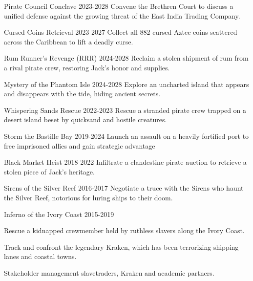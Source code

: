 \begin{cventries}
\cventry
{Pirate Council Conclave} %
{}{}
{2023-2028} %
{ %
Convene the Brethren Court to discuss a unified defense against the growing threat of the East India Trading Company.
}

\cventry
{Cursed Coins Retrieval} %
{}{}
{2023-2027} %
{ %
Collect all 882 cursed Aztec coins scattered across the Caribbean to lift a deadly curse.
}

\cventry
{Rum Runner’s Revenge (RRR)} %
{}{}
{2024-2028} %
{ %
Reclaim a stolen shipment of rum from a rival pirate crew, restoring Jack's honor and supplies.
}

\cventry
{Mystery of the Phantom Isle} %
{}{}
{2024-2028} %
{ %
Explore an uncharted island that appears and disappears with the tide, hiding ancient secrets.
}
\end{cventries}

\begin{cventries}
\cventry
{Whispering Sands Rescue} %
{}{}
{2022-2023} %
{ %
Rescue a stranded pirate crew trapped on a desert island beset by quicksand and hostile creatures.
}

\cventry
{Storm the Bastille Bay} %
{}{}
{2019-2024} %
{ %
Launch an assault on a heavily fortified port to free imprisoned allies and gain strategic advantage
}

\cventry
{Black Market Heist} %
{}{}
{2018-2022} %
{ %
Infiltrate a clandestine pirate auction to retrieve a stolen piece of Jack’s heritage.
}

\cventry
{Sirens of the Silver Reef} %
{}{}
{2016-2017} %
{ %
Negotiate a truce with the Sirens who haunt the Silver Reef, notorious for luring ships to their doom.
}

\cventry
{Inferno of the Ivory Coast} %
{}{}
{2015-2019} %
{ %
\vspace{-4mm}
\begin{cvitemsnested}
    \item {Rescue a kidnapped crewmember held by ruthless slavers along the Ivory Coast.}
    \item {Track and confront the legendary Kraken, which has been terrorizing shipping lanes and coastal towns.} 
    \item {Stakeholder management slavetraders, Kraken and academic partners.}
\end{cvitemsnested} 
\vspace{-4mm}
}

\end{cventries}
